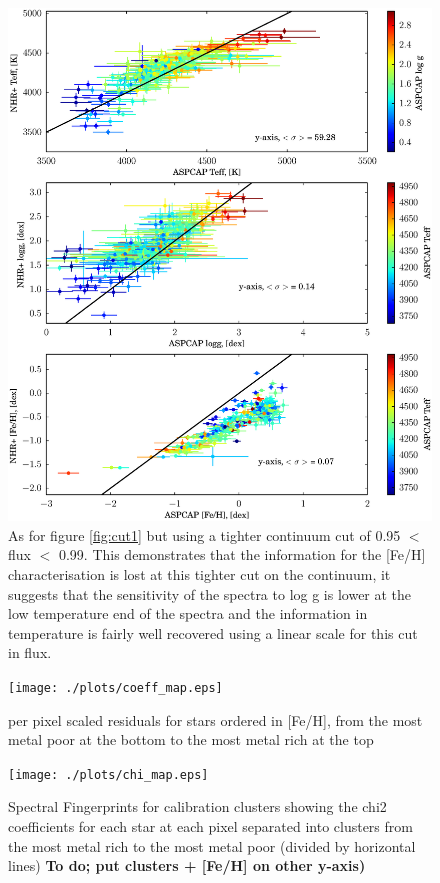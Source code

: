 \documentclass[12pt, preprint]{aastex}
\begin{document}
\begin{figure}[h!]
  \includegraphics[width=\hsize]{./plots/fits_all3_continuumcut2.eps}
\caption{\small{As for figure \ref{fig:cut1} but using a tighter continuum cut of 0.95 $<$ flux $<$ 0.99. This demonstrates that the information for the [Fe/H] characterisation is lost at this tighter cut on the continuum, it suggests that the sensitivity of the spectra to log g is lower at the low temperature end of the spectra and the information in temperature is fairly well recovered using a linear scale for this cut in flux. } }
\label{fig:cut2}
\end{figure}

\begin{figure}[h!]
  \texttt{[image: ./plots/coeff\_map.eps]}
\caption{per pixel scaled residuals for stars ordered in [Fe/H], from the most metal poor at the bottom to the most metal rich at the top}
\label{fig:coeff}
\end{figure}

\begin{figure}[h!]
  \texttt{[image: ./plots/chi\_map.eps]}
\caption{Spectral Fingerprints for calibration clusters showing the chi2 coefficients for each star at each pixel separated into clusters from the most metal rich to the most metal poor (divided by horizontal lines) 
\textbf{To do; put clusters + [Fe/H] on other y-axis)}}
\label{fig:DNA}
\end{figure}
\end{document}
